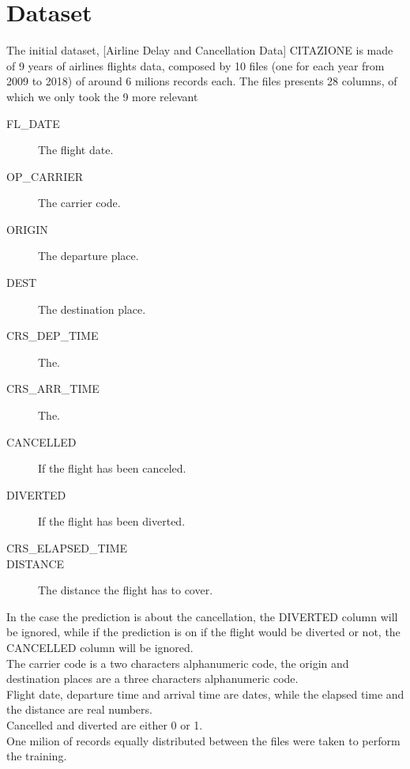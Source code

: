 \documentclass[
	letterpaper, %
	10pt, %
]{class}
\begin{document}

\section{Dataset}

The initial dataset, [Airline Delay and Cancellation Data] CITAZIONE is made of 9 years of airlines flights data, composed by 10 files (one for each year from 2009 to 2018) of around 6 milions records each.
The files presents 28 columns, of which we only took the 9 more relevant\\

\begin{description}
	\item[FL\_DATE] The flight date.
	\item[OP\_CARRIER] The carrier code.
	\item[ORIGIN] The departure place.
	\item[DEST] The destination place.
	\item[CRS\_DEP\_TIME] The.
	\item[CRS\_ARR\_TIME] The.
	\item[CANCELLED] If the flight has been canceled.
	\item[DIVERTED] If the flight has been diverted.
	\item[CRS\_ELAPSED\_TIME]
	\item[DISTANCE] The distance the flight has to cover.
\end{description}

In the case the prediction is about the cancellation, the DIVERTED column will be ignored, while if the prediction is on if the flight would be diverted or not, the CANCELLED column will be ignored.\\

The carrier code is a two characters alphanumeric code, the origin and destination places are a three characters alphanumeric code.\\
Flight date, departure time and arrival time are dates, while the elapsed time and the distance are real numbers.\\
Cancelled and diverted are either 0 or 1.\\

One milion of records equally distributed between the files were taken to perform the training.
\end{document}
